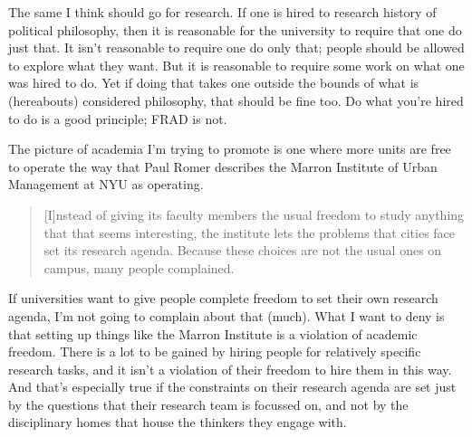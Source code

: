 The same I think should go for research. If one is hired to research history of political philosophy, then it is reasonable for the university to require that one do just that. It isn't reasonable to require one do only that; people should be allowed to explore what they want. But it is reasonable to require some work on what one was hired to do. Yet if doing that takes one outside the bounds of what is (hereabouts) considered philosophy, that should be fine too. Do what you're hired to do is a good principle; FRAD is not.

The picture of academia I'm trying to promote is one where more units are free to operate the way that Paul Romer describes the Marron Institute of Urban Management at NYU as operating.

\begin{quote}

[I]nstead of giving its faculty members the usual freedom to study anything that that seems interesting, the institute lets the problems that cities face set its research agenda. Because these choices are not the usual ones on campus, many people complained. ~\citep{Romer2016}
\end{quote}
If universities want to give people complete freedom to set their own research agenda, I'm not going to complain about that (much). What I want to deny is that setting up things like the Marron Institute is a violation of academic freedom. There is a lot to be gained by hiring people for relatively specific research tasks, and it isn't a violation of their freedom to hire them in this way. And that's especially true if the constraints on their research agenda are set just by the questions that their research team is focussed on, and not by the disciplinary homes that house the thinkers they engage with.

%
%
%
%

%